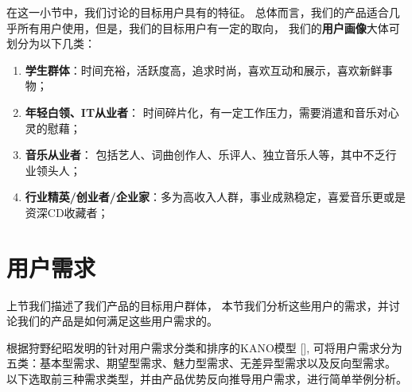 在这一小节中，我们讨论\proname 的目标用户具有的特征。
总体而言，我们的产品适合几乎所有用户使用，但是，我们的目标用户有一定的取向，
我们的\textbf{用户画像}大体可划分为以下几类：
\begin{enumerate}
    \item \textbf{学生群体}：时间充裕，活跃度高，追求时尚，喜欢互动和展示，喜欢新鲜事物；
    \item \textbf{年轻白领、IT从业者}：
    时间碎片化，有一定工作压力，需要消遣和音乐对心灵的慰藉；
    \item \textbf{音乐从业者}：
    包括艺人、词曲创作人、乐评人、独立音乐人等，其中不乏行业领头人；
    \item \textbf{行业精英/创业者/企业家}：多为高收入人群，事业成熟稳定，喜爱音乐更或是资深CD收藏者；
\end{enumerate}

\section{用户需求} %

上节我们描述了我们产品的目标用户群体， 
    本节我们分析这些用户的需求，并讨论我们的产品是如何满足这些用户需求的。

根据狩野纪昭发明的针对用户需求分类和排序的KANO模型
    [\cite{gunther2000quality}], 
    可将用户需求分为五类：基本型需求、期望型需求、魅力型需求、无差异型需求以及反向型需求。
    以下选取前三种需求类型，并由产品优势反向推导用户需求，进行简单举例分析。

